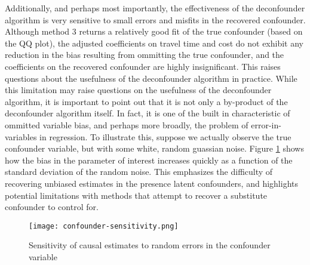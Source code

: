 Additionally, and perhaps most importantly, the effectiveness of the 
deconfounder algorithm is very sensitive to small errors and misfits in the 
recovered confounder. Although method 3 returns a relatively good fit of the 
true confounder (based on the QQ plot), the adjusted coefficients on travel 
time and cost do not exhibit any reduction in the bias resulting from 
ommitting the true confounder, and the coefficients on the recovered 
confounder are highly insignificant. This raises questions about the 
usefulness of the deconfounder algorithm in practice. While this limitation 
may raise questions on the usefulness of the deconfounder algorithm, it is 
important to point out that it is not only a by-product of the deconfounder 
algorithm itself. In fact, it is one of the built in characteristic of ommitted
variable bias, and perhaps more broadly, the problem of error-in-variables in 
regression. To illustrate this, suppose we actually observe the true 
confounder variable, but with some white, random guassian noise. Figure \ref{fig:confounder-sensitivity}
shows how the bias in the parameter of interest increases quickly as a 
function of the standard deviation of the random noise. This emphasizes the 
difficulty of recovering unbiased estimates in the presence latent confounders,
and highlights potential limitations with methods that attempt to recover a 
substitute confounder to control for. 

\begin{figure}
   \centering
   \texttt{[image: confounder-sensitivity.png]}
   \caption{Sensitivity of causal estimates to random errors in the confounder variable}
   \label{fig:confounder-sensitivity}
\end{figure}

